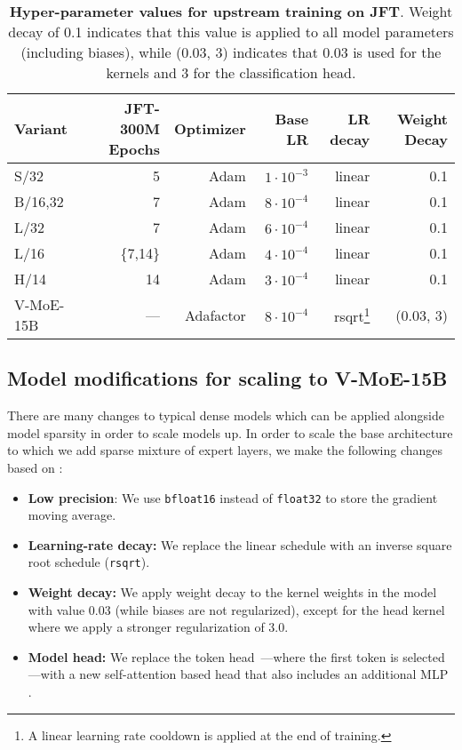 \documentclass{article}
\newcommand{\abbv}{{V-MoE}}
\begin{document}
\begin{table}[tb]
\centering
\caption{
\textbf{Hyper-parameter values for upstream training on JFT}.
Weight decay of 0.1 indicates that this value is applied to all model parameters (including biases), 
while (0.03, 3) indicates that 0.03 is used for the kernels and 3 for the classification head.
\label{tab:upstream_hparams}}
\begin{tabular}{lrrrrr}
\toprule
Variant   & JFT-300M Epochs & Optimizer & Base LR & LR decay & Weight Decay\\
\midrule
S/32      & 5        & Adam      & $1 \cdot 10^{-3}$ & linear & 0.1\\
B/{16,32} & 7        & Adam      & $8 \cdot 10^{-4}$ & linear & 0.1\\
L/32      & 7        & Adam      & $6 \cdot 10^{-4}$ & linear & 0.1\\  
L/16      & \{7,14\} & Adam      & $4 \cdot 10^{-4}$ & linear & 0.1\\
H/14      & 14       & Adam      & $3 \cdot 10^{-4}$ & linear & 0.1\\
V-MoE-15B & ---      & Adafactor & $8 \cdot 10^{-4}$ & rsqrt\footnote{A linear learning rate cooldown is applied at the end of training.} & (0.03, 3)\\
\bottomrule     
\end{tabular}
\end{table}


\subsection{Model modifications for scaling to \abbv{}-15B}
\label{app:vitg_tricks}
There are many changes to typical dense models which can be applied alongside model sparsity in order to scale models up. In order to scale the base architecture to which we add sparse mixture of expert layers, we make the following changes based on \cite{zhai2021scaling}:


\begin{itemize}
    \item \textbf{Low precision}: We use \texttt{bfloat16} instead of \texttt{float32} to store the gradient moving average.
    \item \textbf{Learning-rate decay:} We replace the linear schedule with an inverse square root schedule (\texttt{rsqrt}).
    \item \textbf{Weight decay:} We apply weight decay to the kernel weights in the model with value 0.03 (while biases are not regularized), except for the head kernel where we apply a stronger regularization of 3.0.
    \item \textbf{Model head:} We replace the token head~\cite{dosovitskiy2020image}---where the first token is selected---with a new self-attention based head that also includes an additional MLP \cite{zhai2021scaling}.
\end{itemize}
\end{document}
